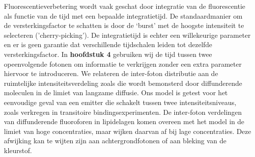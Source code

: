 Fluorescentieverbetering wordt vaak geschat door integratie van de fluorescentie als functie van de tijd met een bepaalde integratietijd. De standaardmanier om de versterkingsfactor te schatten is door de ‘burst’ met de hoogste intensiteit te selecteren ('cherry-picking'). De integratietijd is echter een willekeurige parameter en er is geen garantie dat verschillende tijdschalen leiden tot dezelfde versterkingsfactor. In \textbf{hoofdstuk 4} gebruiken wij  de tijd  tussen twee opeenvolgende fotonen  om informatie te verkrijgen zonder een extra parameter hiervoor te introduceren. We relateren de inter-foton distributie aan de ruimtelijke intensiteitsverdeling zoals die wordt bemonsterd door diffunderende moleculen in de limiet van langzame diffusie. Ons model is getest voor het eenvoudige geval van een emitter die schakelt tussen twee intensiteitsniveaus, zoals verkregen in transitoire bindingsexperimenten. De inter-foton verdelingen van diffunderende fluoroforen in lipidelagen komen overeen met het model in de limiet van hoge concentraties, maar wijken daarvan af bij lage concentraties. Deze afwijking kan te wijten zijn aan achtergrondfotonen of aan bleking van de kleurstof.


